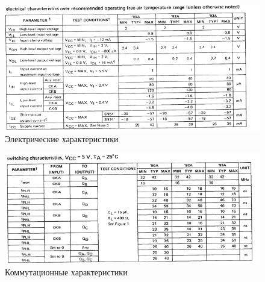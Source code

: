 \begin{figure}[H]
	\centering
	\includegraphics[width=0.95\linewidth]{imgs/13/13_ch}
	\caption{Электрические характеристики}
	\label{fig:13_ch}
\end{figure}

\begin{figure}[H]
	\centering
	\includegraphics[width=0.95\linewidth]{imgs/13/13_switch}
	\caption{Коммутационные характеристики}
	\label{fig:13_switch}
\end{figure}
